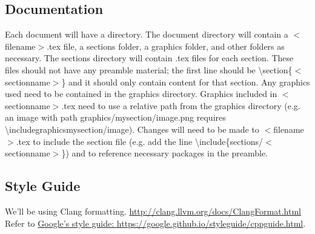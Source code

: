 \subsection*{Documentation}
Each document will have a directory. The document directory will contain a $<$filename$>$.tex file, a sections folder, a graphics folder, and other folders as necessary. The sections directory will contain .tex files for each section. These files should not have any preamble material; the first line should be \textbackslash section\{$<$sectionname$>$\} and it should only contain content for that section. Any graphics used need to be contained in the graphics directory. Graphics included in $<$sectionname$>$.tex need to use a relative path from the graphics directory (e.g. an image with path graphics/mysection/image.png requires \textbackslash includegraphics{mysection/image}). Changes will need to be made to $<$filename$>$.tex to include the section file (e.g. add the line \textbackslash include\{sections/$<$sectionname$>$\}) and to reference necessary packages in the preamble.
\subsection*{Style Guide}
We'll be using Clang formatting. \href{http://clang.llvm.org/docs/ClangFormat.html}{http://clang.llvm.org/docs/ClangFormat.html} \\
Refer to \href{https://google.github.io/styleguide/cppguide.html}{Google's style guide: https://google.github.io/styleguide/cppguide.html}.
